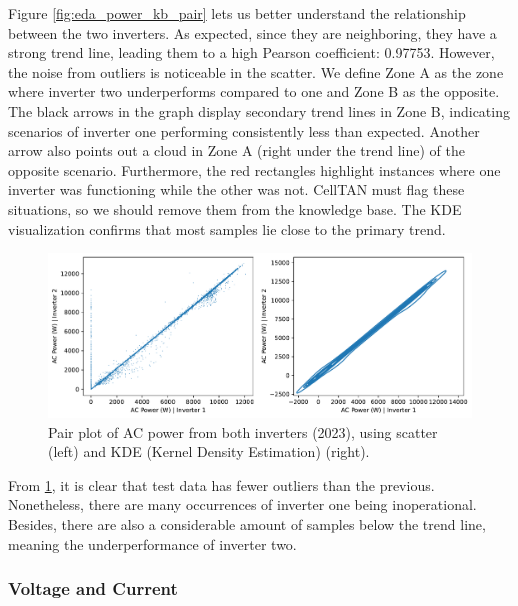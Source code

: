 Figure \ref{fig:eda_power_kb_pair} lets us better understand the relationship between the two inverters. As expected, since they are neighboring, they have a strong trend line, leading them to a high Pearson coefficient: 0.97753. However, the noise from outliers is noticeable in the scatter. We define Zone A as the zone where inverter two underperforms compared to one and Zone B as the opposite. The black arrows in the graph display secondary trend lines in Zone B, indicating scenarios of inverter one performing consistently less than expected. Another arrow also points out a cloud in Zone A (right under the trend line) of the opposite scenario. Furthermore, the red rectangles highlight instances where one inverter was functioning while the other was not. CellTAN must flag these situations, so we should remove them from the knowledge base.
The KDE visualization confirms that most samples lie close to the primary trend.

\begin{figure}[h!]
    \centering
    \includegraphics[width=\textwidth]{figures/chapter5/analysis/03_power_pairplots_test.pdf}
    \caption{Pair plot of AC power from both inverters (2023), using scatter (left) and KDE (Kernel Density Estimation) (right).}
    \label{fig:eda_power_test_pair}
\end{figure}

From \ref{fig:eda_power_test_pair}, it is clear that test data has fewer outliers than the previous. Nonetheless, there are many occurrences of inverter one being inoperational. Besides, there are also a considerable amount of samples below the trend line, meaning the underperformance of inverter two.


\subsubsection{Voltage and Current}

